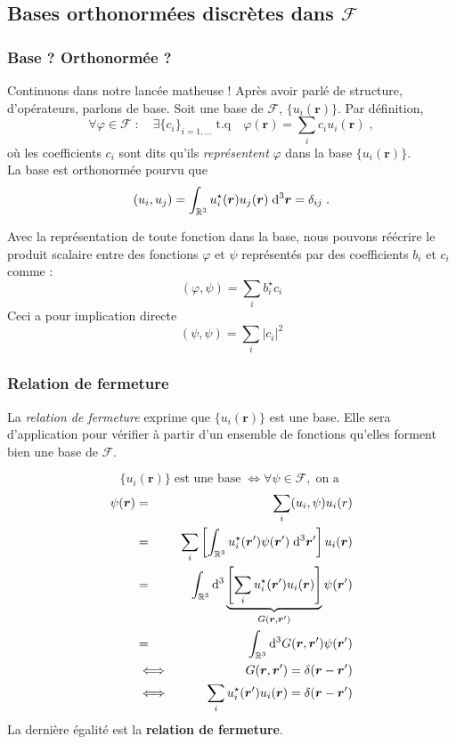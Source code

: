 \documentclass[../notesdecours.tex]{subfiles}
\begin{document}
\subsection{Bases orthonormées discrètes dans $\mathcal F$}
\subsubsection{Base ? Orthonormée ?}
Continuons dans notre lancée matheuse ! Après avoir parlé de structure, d'opérateurs, parlons de base. Soit une base de $\mathcal F$, $\{u_i(\bm{r})\}$. Par définition, 
\begin{equation}
\label{eq:base_orthonormee_F}
\forall \varphi \in \mathcal F \; : \quad \exists \{c_i\}_{i=1, ...} \; \mathrm{t.q} \quad \varphi(\bm{r}) = \sum_i c_i u_i(\bm{r}) \; ,
\end{equation}
où les coefficients $c_i$ sont dits qu'ils \textit{représentent} $\varphi$ dans la base $\{u_i(\bm{r})\}$.\\

La base est orthonormée pourvu que 
\begin{equation}
\label{eq:orthonorm_F}
(u_i, u_j) = \int_{\mathbb R ^3} u_i ^\star(\bm{r}) u_j(\bm{r}) \; \mathrm{d} ^3 \bm{r} = \delta_{ij} \; .
\end{equation}

Avec la représentation de toute fonction dans la base, nous pouvons réécrire le produit scalaire entre des fonctions $\varphi$ et $\psi$ représentés par des coefficients $b_i$ et $c_i$ comme :
$$(\varphi, \psi) = \sum_i b_i ^\star c_i$$
Ceci a pour implication directe 
\begin{equation}
\label{eq:base_orthonormee_coeffsci}
(\psi, \psi) = \sum_i |c_i|^2
\end{equation}

\subsubsection{Relation de fermeture}
La \textit{relation de fermeture} exprime que $\{u_i(\bm{r})\}$ est une base. Elle sera d'application pour vérifier à partir d'un ensemble de fonctions qu'elles forment bien une base de $\mathcal F$.

$$\{u_i(\bm{r})\} \; \text{est une base} \; \iff \forall \psi \in \mathcal F, \;\text{on a }$$
\begin{eqnarray}
\psi(\bm{r}) &=& \sum_i (u_i, \psi) u_i(r) \\
&=& \sum_i \left[\int_{\mathbb R ^3} u_i ^\star(\bm{r}') \psi(\bm{r}') \; \mathrm{d} ^3 \bm{r}'\right] u_i(\bm{r}) \\
&=& \int_{\mathbb R ^3}\mathrm{d} ^3  \underbrace{\left[\sum_iu_i ^\star(\bm{r}')u_i(\bm{r}) \right]}_{G(\bm{r}, \bm{r}')}\psi(\bm{r}') \\
&=& \int_{\mathbb R ^3}\mathrm{d} ^3 G(\bm{r}, \bm{r}')\psi(\bm{r}') \\
&\iff& G(\bm{r}, \bm{r}') = \delta(\bm{r}-\bm{r}') \\
&\iff& \sum_iu_i ^\star(\bm{r}')u_i(\bm{r}) = \delta(\bm{r}-\bm{r}') 
\end{eqnarray}
La dernière égalité est la \textbf{relation de fermeture}.
\end{document}
